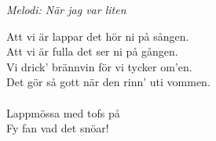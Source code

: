 {\footnotesize\textit{Melodi: När jag var liten}}\par
\vspace{10pt}
Att vi är lappar det hör ni på sången.\\
Att vi är fulla det ser ni på gången.\\
Vi drick' brännvin för vi tycker om'en.\\
Det gör så gott när den rinn' uti vommen.\\
\\
Lappmössa med tofs på\\
Fy fan vad det snöar!
